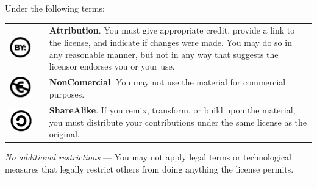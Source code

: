 Under the following terms:
\begin{center}
\begin{tabular}{ccp{10cm}}
\includegraphics[scale=0.15]{../img/cc-by.pdf} & \quad & \textbf{Attribution}. You must give appropriate credit, provide
a link to the license, and indicate if changes were made. You may do so in any reasonable manner, but not in any way that
suggests the licensor endorses you or your use.\\ 
\includegraphics[scale=0.15]{../img/cc-e.pdf} & \quad & \textbf{NonComercial}. You may not use the material for
commercial purposes.\\
\includegraphics[scale=0.15]{../img/cc-c.pdf} & \quad & \textbf{ShareAlike}. If you remix, transform, or build upon the
material, you must distribute your contributions under the same license as the original. 
\end{tabular}
\end{center}

\emph{No additional restrictions} — You may not apply legal terms or technological measures that legally restrict others
from doing anything the license permits.

\smallskip

\hrule depth 3pt

\normalfont
\newpage

